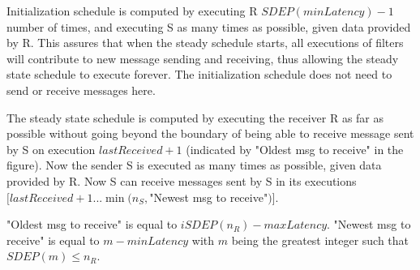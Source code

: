 Initialization schedule is computed by executing R $SDEP(minLatency)-1$ number of times, and executing S as many times as possible, given data provided by R. This assures that when the steady schedule starts, all executions of filters will contribute to new message sending and receiving, thus allowing the steady state schedule to execute forever. The initialization schedule does not need to send or receive messages here.

The steady state schedule is computed by executing the receiver R as far as possible without going beyond the boundary of being able to receive message sent by S on execution $lastReceived+1$ (indicated by "Oldest msg to receive" in the figure). Now the sender S is executed as many times as possible, given data provided by R. Now S can receive messages sent by S in its executions $[lastReceived+1 ... \min(n_S, $"Newest msg to receive"$)]$.

"Oldest msg to receive" is equal to $iSDEP(n_R)-maxLatency$. "Newest msg to receive" is equal to $m-minLatency$ with $m$ being the greatest integer such that $SDEP(m) \le n_R$.
